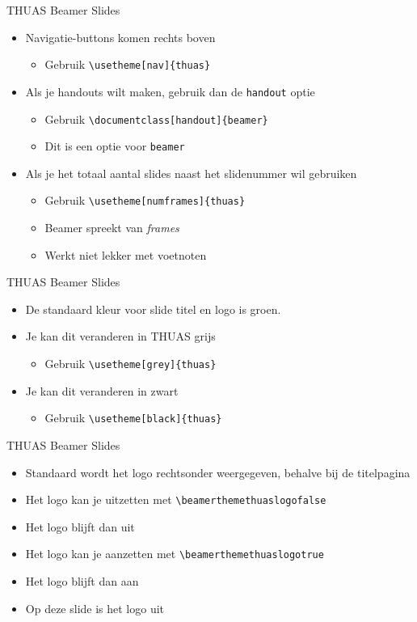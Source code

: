 \documentclass[fleqn,aspectratio=169,dutch,10pt]{beamer}
\begin{document}
\begin{frame}[fragile]{THUAS Beamer Slides}
\begin{itemize}
\item Navigatie-buttons komen rechts boven
\begin{itemize}
\item Gebruik \lstinline|\usetheme[nav]{thuas}|
\end{itemize}
\item Als je handouts wilt maken, gebruik dan de \lstinline|handout| optie
\begin{itemize}
\item Gebruik \lstinline|\documentclass[handout]{beamer}|
\item Dit is een optie voor \lstinline|beamer|
\end{itemize}
\item Als je het totaal aantal slides naast het slidenummer wil gebruiken
\begin{itemize}
\item Gebruik \lstinline|\usetheme[numframes]{thuas}|
\item Beamer spreekt van \textsl{frames}
\item Werkt niet lekker met voetnoten
\end{itemize}
\end{itemize}
\end{frame}

\begin{frame}[fragile]{THUAS Beamer Slides}
\begin{itemize}
\item De standaard kleur voor slide titel en logo is groen.
\item Je kan dit veranderen in THUAS grijs
\begin{itemize}
\item Gebruik \lstinline|\usetheme[grey]{thuas}|
\end{itemize}
\item Je kan dit veranderen in zwart
\begin{itemize}
\item Gebruik \lstinline|\usetheme[black]{thuas}|
\end{itemize}
\end{itemize}
\end{frame}

\beamerthemethuaslogofalse

\begin{frame}[fragile]{THUAS Beamer Slides}
\begin{itemize}
\item Standaard wordt het logo rechtsonder weergegeven, behalve bij de titelpagina
\item Het logo kan je uitzetten met \lstinline|\beamerthemethuaslogofalse|
\item Het logo blijft dan uit
\item Het logo kan je aanzetten met \lstinline|\beamerthemethuaslogotrue|
\item Het logo blijft dan aan
\item Op deze slide is het logo uit
\end{itemize}
\end{frame}
\end{document}
